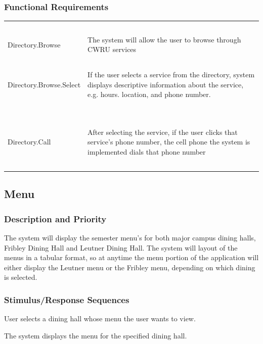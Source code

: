 \documentclass[pdftex,12pt,letter]{article}
\begin{document}
\subsubsection{Functional Requirements}
\begin{table}[!h]
\begin{tabularx}{\textwidth }[t]{|l Y|}
\hline
~&~\\
Directory.Browse & The system will allow the user to browse through CWRU services\\ 
~&~\\
Directory.Browse.Select & If the user selects a service from the directory, system displays descriptive information about the service, e.g. hours. location, and phone number.\\
~&~\\
\hline
~&~\\
Directory.Call & After selecting the service, if the user clicks that service's phone number, the cell phone the system is implemented dials that phone number\\
~&~\\
\hline
\end{tabularx}
\end{table}
\FloatBarrier
\subsection{Menu}
\subsubsection{Description and Priority}
The system will display the semester menu's for both major campus dining halls, Fribley Dining Hall and Leutner Dining Hall. The system will layout of the menus in a tabular format, so at anytime the menu portion of the application will either display the Leutner menu or the Fribley menu, depending on which dining is selected.
\subsubsection{Stimulus/Response Sequences}
\begin{description}\itemsep1pt
\item[Stimulus:] User selects a dining hall whose menu the user wants to view.
\item[Response:] The system displays the menu for the specified dining hall.
\end{description}
\end{document}
